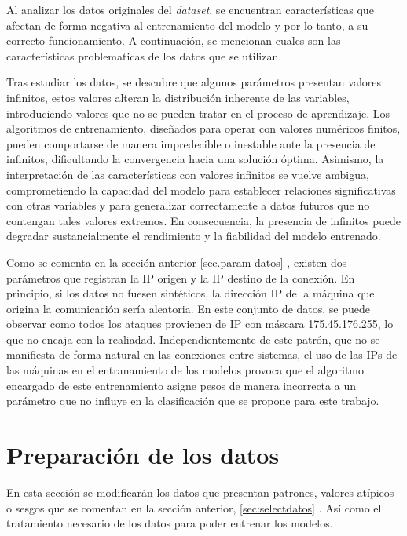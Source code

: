 Al analizar los datos originales del \textit{dataset}, se encuentran características que afectan de forma negativa al entrenamiento del modelo y por lo tanto, a su correcto funcionamiento. A continuación, se mencionan cuales son las características problematicas de los datos que se utilizan.


Tras estudiar los datos, se descubre que algunos parámetros presentan valores infinitos, estos valores alteran la distribución inherente de las variables, introduciendo valores que no se pueden tratar en el proceso de aprendizaje. Los algoritmos de entrenamiento, diseñados para operar con valores numéricos finitos, pueden comportarse de manera impredecible o inestable ante la presencia de infinitos, dificultando la convergencia hacia una solución óptima. Asimismo, la interpretación de las características con valores infinitos se vuelve ambigua, comprometiendo la capacidad del modelo para establecer relaciones significativas con otras variables y para generalizar correctamente a datos futuros que no contengan tales valores extremos. En consecuencia, la presencia de infinitos puede degradar sustancialmente el rendimiento y la fiabilidad del modelo entrenado.

Como se comenta en la sección anterior \ref{sec.param-datos} , existen dos parámetros que registran la IP origen y la IP destino de la conexión. En principio, si los datos no fuesen sintéticos, la dirección IP de la máquina que origina la comunicación sería aleatoria. En este conjunto de datos, se puede observar como todos los ataques provienen de IP con máscara 175.45.176.255, lo que no encaja con la realiadad. Independientemente de este patrón, que no se manifiesta de forma natural en las conexiones entre sistemas, el uso de las IPs de las máquinas en el entranamiento de los modelos provoca que el algoritmo encargado de este entrenamiento asigne pesos de manera incorrecta a un parámetro que no influye en la clasificación que se propone para este trabajo.



\section{Preparación de los datos}\label{sec.prep-datos}
En esta sección se modificarán los datos que presentan patrones, valores atípicos o sesgos que se comentan en la sección anterior, \ref{sec:selectdatos} . Así como el tratamiento necesario de los datos para poder entrenar los modelos.

